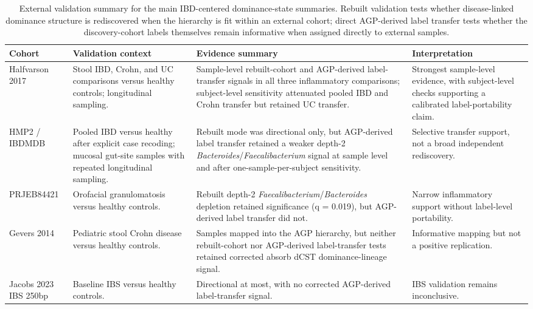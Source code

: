 \documentclass[
  11pt,
]{article}
\newcommand{\taxon}[1]{\emph{#1}}
\newcommand{\dcstsep}{/\allowbreak}
\begin{document}
\begin{table}[H]
\footnotesize
\caption{External validation summary for the main IBD-centered
dominance-state summaries. Rebuilt validation tests whether disease-linked
dominance structure is rediscovered when the hierarchy is fit within an
external cohort; direct AGP-derived label transfer tests whether the
discovery-cohort labels themselves remain informative when assigned
directly to external samples.}
\centering
\begin{tabularx}{\textwidth}{@{} l Y Y Y @{}}
\toprule
Cohort & Validation context & Evidence summary & Interpretation \\
\midrule
Halfvarson 2017 & Stool IBD, Crohn, and UC comparisons versus healthy controls; longitudinal sampling. & Sample-level rebuilt-cohort and AGP-derived label-transfer signals in all three inflammatory comparisons; subject-level sensitivity attenuated pooled IBD and Crohn transfer but retained UC transfer. & Strongest sample-level evidence, with subject-level checks supporting a calibrated label-portability claim. \\
HMP2 / IBDMDB & Pooled IBD versus healthy after explicit case recoding; mucosal gut-site samples with repeated longitudinal sampling. & Rebuilt mode was directional only, but AGP-derived label transfer retained a weaker depth-2 \taxon{Bacteroides}\dcstsep\taxon{Faecalibacterium} signal at sample level and after one-sample-per-subject sensitivity. & Selective transfer support, not a broad independent rediscovery. \\
PRJEB84421 & Orofacial granulomatosis versus healthy controls. & Rebuilt depth-2 \taxon{Faecalibacterium}\dcstsep\taxon{Bacteroides} depletion retained significance (q = 0.019), but AGP-derived label transfer did not. & Narrow inflammatory support without label-level portability. \\
Gevers 2014 & Pediatric stool Crohn disease versus healthy controls. & Samples mapped into the AGP hierarchy, but neither rebuilt-cohort nor AGP-derived label-transfer tests retained corrected absorb dCST dominance-lineage signal. & Informative mapping but not a positive replication. \\
Jacobs 2023 IBS 250bp & Baseline IBS versus healthy controls. & Directional at most, with no corrected AGP-derived label-transfer signal. & IBS validation remains inconclusive. \\
\bottomrule
\end{tabularx}
\end{table}
\end{document}
